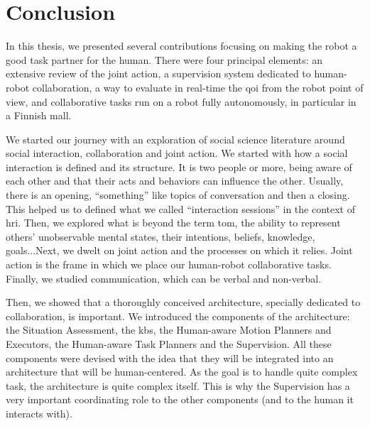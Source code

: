 \documentclass[a4paper,11pt,twoside]{StyleThese}
\begin{document}
\fi


\chapter*{Conclusion}


In this thesis, we presented several contributions focusing on making the robot a good task partner for the human. There were four principal elements: an extensive review of the joint action, a supervision system dedicated to human-robot collaboration, a way to evaluate in real-time the \acrlong{qoi} from the robot point of view, and collaborative tasks run on a robot fully autonomously, in particular in a Finnish mall. 

We started our journey with an exploration of social science literature around social interaction, collaboration and joint action. We started with how a social interaction is defined and its structure. It is two people or more, being aware of each other and that their acts and behaviors can influence the other. Usually, there is an opening, ``something'' like topics of conversation and then a closing. This helped us to defined what we called ``interaction sessions'' in the context of \acrshort{hri}. Then, we explored what is beyond the term \acrfull{tom}, the ability to represent others' unobservable mental states, \ie their intentions, beliefs, knowledge, goals...Next, we dwelt on joint action and the processes on which it relies. Joint action is the frame in which we place our human-robot collaborative tasks. Finally, we studied communication, which can be verbal and non-verbal.

Then, we showed that a thoroughly conceived architecture, specially dedicated to collaboration, is important. We introduced the components of the architecture: the Situation Assessment, the \acrshort{kb}s, the Human-aware Motion Planners and Executors, the Human-aware Task Planners and the Supervision. All these components were devised with the idea that they will be integrated into an architecture that will be human-centered. As the goal is to handle quite complex task, the architecture is quite complex itself. This is why the Supervision has a very important coordinating role to the other components (and to the human it interacts with). 
\end{document}
